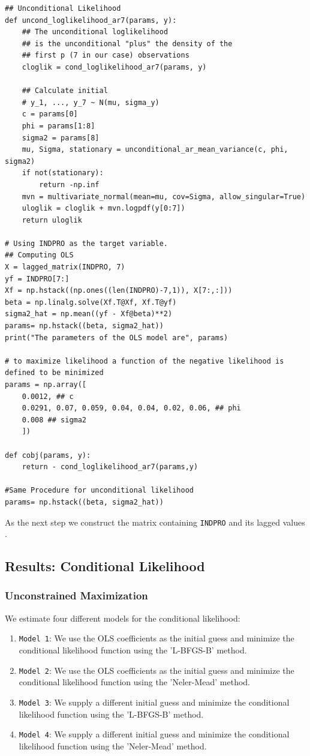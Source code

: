 \documentclass{article}
\begin{document}
\begin{verbatim}
## Unconditional Likelihood
def uncond_loglikelihood_ar7(params, y):
    ## The unconditional loglikelihood
    ## is the unconditional "plus" the density of the
    ## first p (7 in our case) observations
    cloglik = cond_loglikelihood_ar7(params, y)

    ## Calculate initial
    # y_1, ..., y_7 ~ N(mu, sigma_y)
    c = params[0] 
    phi = params[1:8]
    sigma2 = params[8]
    mu, Sigma, stationary = unconditional_ar_mean_variance(c, phi, sigma2)
    if not(stationary):
        return -np.inf
    mvn = multivariate_normal(mean=mu, cov=Sigma, allow_singular=True)
    uloglik = cloglik + mvn.logpdf(y[0:7])
    return uloglik
    
# Using INDPRO as the target variable.
## Computing OLS
X = lagged_matrix(INDPRO, 7)
yf = INDPRO[7:]
Xf = np.hstack((np.ones((len(INDPRO)-7,1)), X[7:,:]))
beta = np.linalg.solve(Xf.T@Xf, Xf.T@yf)
sigma2_hat = np.mean((yf - Xf@beta)**2)
params= np.hstack((beta, sigma2_hat))
print("The parameters of the OLS model are", params)

# to maximize likelihood a function of the negative likelihood is defined to be minimized
params = np.array([
    0.0012, ## c
    0.0291, 0.07, 0.059, 0.04, 0.04, 0.02, 0.06, ## phi
    0.008 ## sigma2    
    ])

def cobj(params, y): 
    return - cond_loglikelihood_ar7(params,y)

#Same Procedure for unconditional likelihood
params= np.hstack((beta, sigma2_hat))
\end{verbatim}
As the next step we construct the matrix containing \texttt{INDPRO} and its lagged values .

\subsection{Results: Conditional Likelihood}
\subsubsection{Unconstrained Maximization}
We estimate four different models for the conditional likelihood:
\begin{enumerate}
\item \texttt{Model 1}: We use the OLS coefficients as the initial guess and minimize the conditional likelihood function using the 'L-BFGS-B' method.
\item \texttt{Model 2}: We use the OLS coefficients as the initial guess and minimize the conditional likelihood function using the 'Neler-Mead' method.
\item \texttt{Model 3}: We supply a different initial guess and minimize the conditional likelihood function using the 'L-BFGS-B' method.
\item \texttt{Model 4}: We supply a different initial guess and minimize the conditional likelihood function using the  'Neler-Mead' method.
\end{enumerate}
\end{document}
